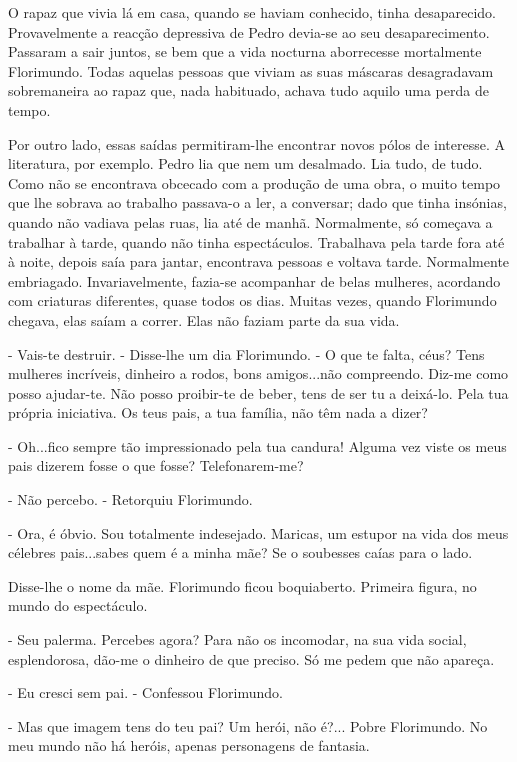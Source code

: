 O rapaz que vivia lá em casa, quando se haviam conhecido, tinha
desaparecido. Provavelmente a reacção depressiva de Pedro devia-se ao
seu desaparecimento. Passaram a sair juntos, se bem que a vida nocturna
aborrecesse mortalmente Florimundo. Todas aquelas pessoas que viviam as
suas máscaras desagradavam sobremaneira ao rapaz que, nada habituado,
achava tudo aquilo uma perda de tempo.

Por outro lado, essas saídas permitiram-lhe encontrar novos pólos de
interesse. A literatura, por exemplo. Pedro lia que nem um desalmado.
Lia tudo, de tudo. Como não se encontrava obcecado com a produção de uma
obra, o muito tempo que lhe sobrava ao trabalho passava-o a ler, a
conversar; dado que tinha insónias, quando não vadiava pelas ruas, lia
até de manhã. Normalmente, só começava a trabalhar à tarde, quando não
tinha espectáculos. Trabalhava pela tarde fora até à noite, depois saía
para jantar, encontrava pessoas e voltava tarde. Normalmente embriagado.
Invariavelmente, fazia-se acompanhar de belas mulheres, acordando com
criaturas diferentes, quase todos os dias. Muitas vezes, quando
Florimundo chegava, elas saíam a correr. Elas não faziam parte da sua
vida.

- Vais-te destruir. - Disse-lhe um dia Florimundo. - O que te falta,
céus? Tens mulheres incríveis, dinheiro a rodos, bons amigos...não
compreendo. Diz-me como posso ajudar-te. Não posso proibir-te de beber,
tens de ser tu a deixá-lo. Pela tua própria iniciativa. Os teus pais, a
tua família, não têm nada a dizer?

- Oh...fico sempre tão impressionado pela tua candura! Alguma vez viste
os meus pais dizerem fosse o que fosse? Telefonarem-me?

- Não percebo. - Retorquiu Florimundo.

- Ora, é óbvio. Sou totalmente indesejado. Maricas, um estupor na vida
dos meus célebres pais...sabes quem é a minha mãe? Se o soubesses caías
para o lado.

Disse-lhe o nome da mãe. Florimundo ficou boquiaberto. Primeira figura,
no mundo do espectáculo.

- Seu palerma. Percebes agora? Para não os incomodar, na sua vida
social, esplendorosa, dão-me o dinheiro de que preciso. Só me pedem que
não apareça.

- Eu cresci sem pai. - Confessou Florimundo.

- Mas que imagem tens do teu pai? Um herói, não é?... Pobre Florimundo.
No meu mundo não há heróis, apenas personagens de fantasia.

